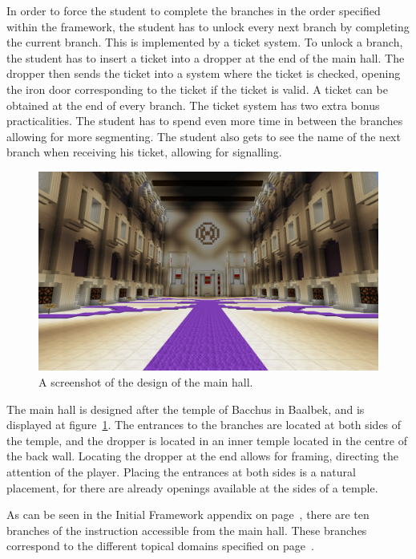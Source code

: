 \documentclass[11pt,twoside]{report} %
\begin{document}
In order to force the student to complete the branches in the order specified within the framework, the student has to unlock every next branch by completing the current branch. This is implemented by a ticket system. To unlock a branch, the student has to insert a ticket into a dropper at the end of the main hall. The dropper then sends the ticket into a system where the ticket is checked, opening the iron door corresponding to the ticket if the ticket is valid. A ticket can be obtained at the end of every branch. The ticket system has two extra bonus practicalities. The student has to spend even more time in between the branches allowing for more segmenting. The student also gets to see the name of the next branch when receiving his ticket, allowing for signalling.

\begin{figure}[h]
\centering
\includegraphics[width=\textwidth]{mainhall}
\caption{A screenshot of the design of the main hall.\label{fig:mainhall}}
\end{figure}

The main hall is designed after the temple of Bacchus in Baalbek, and is displayed at figure~\ref{fig:mainhall}. The entrances to the branches are located at both sides of the temple, and the dropper is located in an inner temple located in the centre of the back wall. Locating the dropper at the end allows for framing, directing the attention of the player. Placing the entrances at both sides is a natural placement, for there are already openings available at the sides of a temple.

As can be seen in the Initial Framework appendix on page~\pageref{app:framework1}, there are ten branches of the instruction accessible from the main hall. These branches correspond to the different topical domains specified on page~\pageref{app:topicaldomains}.
\end{document}
